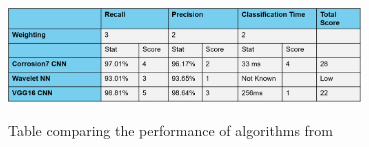 \documentclass[11pt]{article}		%
\newcommand{\supercite}[1]{\textsuperscript{\cite{#1}}}		%
\begin{document}
	        \\
			\begin{table}[h]
				\centering
				\includegraphics[width=0.7\textwidth]{CNN_corrosion_table}
				\caption{Table comparing the performance of algorithms from \cite{Corrosion7}}
				\label{CNN_comparison}
			\end{table}
	        
		    
\end{document}
